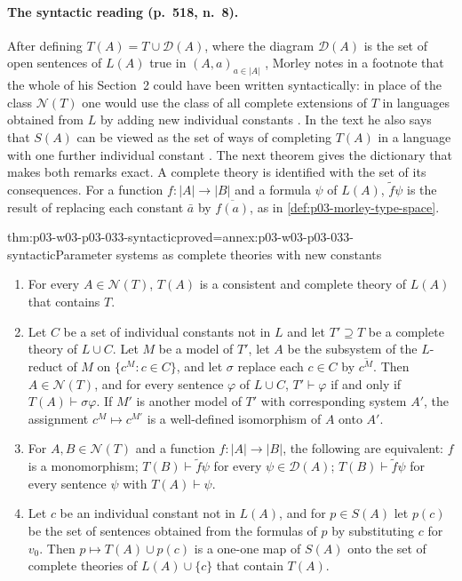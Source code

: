 \paragraph{The syntactic reading (p.~518, n.~8).} After defining
\(T(A)=T\cup\mathscr D(A)\), where the diagram \(\mathscr D(A)\) is the set
of open sentences of \(L(A)\) true in \((A,a)_{a\in|A|}\)
\cite[pp.~516--517]{Morley1965}, Morley notes in a footnote that the
whole of his Section~2 could have been written syntactically: in place of
the class \(\mathcal N(T)\) one would use the class of all complete
extensions of \(T\) in languages obtained from \(L\) by adding new
individual constants \cite[p.~518, n.~8]{Morley1965}. In the text he also
says that \(S(A)\) can be viewed as the set of ways of completing \(T(A)\)
in a language with one further individual constant
\cite[p.~518]{Morley1965}. The next theorem gives the dictionary that
makes both remarks exact. A complete theory is identified with the set of
its consequences. For a function \(f:|A|\to|B|\) and a formula \(\psi\)
of \(L(A)\), \(\tilde f\psi\) is the result of replacing each constant
\(\bar a\) by \(\overline{f(a)}\), as in \cref{def:p03-morley-type-space}.

\begin{hbtheorem}{thm:p03-w03-p03-033-syntactic}{proved=annex:p03-w03-p03-033-syntactic}{Parameter systems as complete theories with new constants}
\begin{enumerate}
\item For every \(A\in\mathcal N(T)\), \(T(A)\) is a consistent and
complete theory of \(L(A)\) that contains \(T\).
\item Let \(C\) be a set of individual constants not in \(L\) and let
\(T'\supseteq T\) be a complete theory of \(L\cup C\). Let \(M\) be a
model of \(T'\), let \(A\) be the subsystem of the \(L\)-reduct of \(M\)
on \(\{c^M:c\in C\}\), and let \(\sigma\) replace each \(c\in C\) by
\(\overline{c^M}\). Then \(A\in\mathcal N(T)\), and for every sentence
\(\varphi\) of \(L\cup C\), \(T'\vdash\varphi\) if and only if
\(T(A)\vdash\sigma\varphi\). If \(M'\) is another model of \(T'\) with
corresponding system \(A'\), the assignment \(c^M\mapsto c^{M'}\) is a
well-defined isomorphism of \(A\) onto \(A'\).
\item For \(A,B\in\mathcal N(T)\) and a function \(f:|A|\to|B|\), the
following are equivalent: \(f\) is a monomorphism; \(T(B)\vdash\tilde
f\psi\) for every \(\psi\in\mathscr D(A)\); \(T(B)\vdash\tilde f\psi\)
for every sentence \(\psi\) with \(T(A)\vdash\psi\).
\item Let \(c\) be an individual constant not in \(L(A)\), and for
\(p\in S(A)\) let \(p(c)\) be the set of sentences obtained from the
formulas of \(p\) by substituting \(c\) for \(v_0\). Then
\(p\mapsto T(A)\cup p(c)\) is a one-one map of \(S(A)\) onto the set of
complete theories of \(L(A)\cup\{c\}\) that contain \(T(A)\).
\end{enumerate}
\end{hbtheorem}

